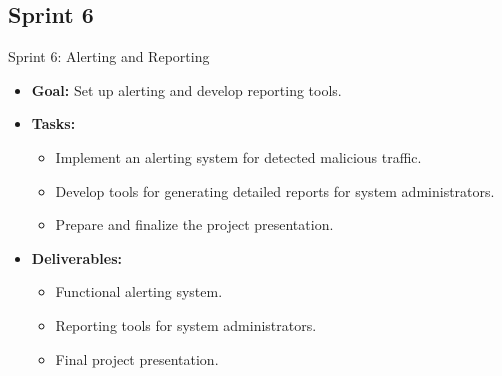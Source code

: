 \documentclass[11pt,a4paper]{article}
\begin{document}
    \subsection{Sprint 6}\label{subsec:sprint-6}
    \begin{frame}{Sprint 6: Alerting and Reporting}
        \begin{itemize}
            \item \textbf{Goal:} Set up alerting and develop reporting tools.
            \item \textbf{Tasks:}
            \begin{itemize}
                \item Implement an alerting system for detected malicious traffic.
                \item Develop tools for generating detailed reports for system administrators.
                \item Prepare and finalize the project presentation.
            \end{itemize}
            \item \textbf{Deliverables:}
            \begin{itemize}
                \item Functional alerting system.
                \item Reporting tools for system administrators.
                \item Final project presentation.
            \end{itemize}
        \end{itemize}
    \end{frame}
\end{document}
